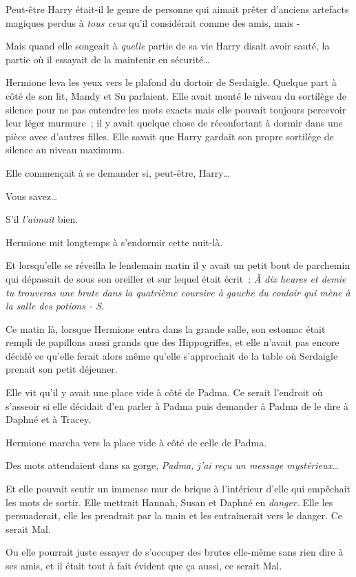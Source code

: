 Peut-être Harry était-il le genre de personne qui aimait prêter d'anciens artefacts magiques perdus à \emph{tous ceux} qu'il considérait comme des amis, mais -

Mais quand elle songeait à \emph{quelle} partie de sa vie Harry disait avoir sauté, la partie où il essayait de la maintenir en sécurité…

Hermione leva les yeux vers le plafond du dortoir de Serdaigle. Quelque part à côté de son lit, Mandy et Su parlaient. Elle avait monté le niveau du sortilège de silence pour ne pas entendre les mots exacts mais elle pouvait toujours percevoir leur léger murmure~; il y avait quelque chose de réconfortant à dormir dans une pièce avec d'autres filles. Elle savait que Harry gardait son propre sortilège de silence au niveau maximum.

Elle commençait à se demander si, peut-être, Harry…

Vous savez…

S'il \emph{l'aimait} bien.

Hermione mit longtemps à s'endormir cette nuit-là.

Et lorsqu'elle se réveilla le lendemain matin il y avait un petit bout de parchemin qui dépassait de sous son oreiller et sur lequel était écrit~: \emph{À dix heures et demie tu trouveras une brute dans la quatrième coursive à gauche du couloir qui mène à la salle des potions - S.}

\later

Ce matin là, lorsque Hermione entra dans la grande salle, son estomac était rempli de papillons aussi grands que des Hippogriffes, et elle n'avait pas encore décidé ce qu'elle ferait alors même qu'elle s'approchait de la table où Serdaigle prenait son petit déjeuner.

Elle vit qu'il y avait une place vide à côté de Padma. Ce serait l'endroit où s'asseoir si elle décidait d'en parler à Padma puis demander à Padma de le dire à Daphné et à Tracey.

Hermione marcha vers la place vide à côté de celle de Padma.

Des mots attendaient dans sa gorge, \emph{Padma, j'ai reçu un message mystérieux}…

Et elle pouvait sentir un immense mur de brique à l'intérieur d'elle qui empêchait les mots de sortir. Elle mettrait Hannah, Susan et Daphné en \emph{danger}. Elle les persuaderait, elle les prendrait par la main et les entraînerait vers le danger. Ce serait Mal.

Ou elle pourrait juste essayer de s'occuper des brutes elle-même sans rien dire à ses amis, et il était tout à fait évident que ça aussi, ce serait Mal.

